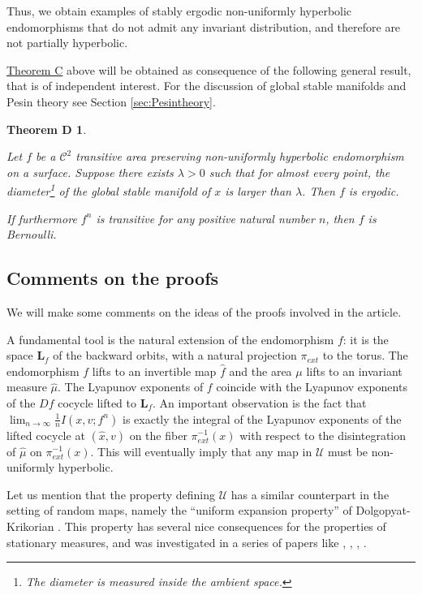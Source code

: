 \documentclass[11pt,letterpaper,reqno]{article}
\newtheorem*{theoremD}{Theorem D}
\newcommand{\hTTf}[1][f]{\mathbf{L}_{#1}}
\begin{document}
Thus, we obtain examples of stably ergodic non-uniformly hyperbolic endomorphisms that do not admit any invariant distribution, and therefore are not partially hyperbolic. 

\smallskip 

\hyperlink{theoremC}{Theorem C} above will be obtained as consequence of the following general result, that is of independent interest. For the discussion of global stable manifolds and Pesin theory see Section \ref{sec:Pesintheory}.

\begin{theoremD}\hypertarget{theoremD}{}
Let $f$ be a $\mathcal C^2$ transitive area preserving non-uniformly hyperbolic endomorphism on a surface. Suppose there exists $\lambda>0$ such that  for almost every point,  the diameter\footnote{The diameter is measured inside the ambient space.} of the global stable manifold of $x$ is larger than $\lambda$. Then $f$ is ergodic.

If furthermore $f^n$ is transitive for any positive natural number $n$, then $f$ is Bernoulli.
\end{theoremD}



\subsection{Comments on the proofs}

We will make some comments on the ideas of the proofs involved in the article.

A fundamental tool is the natural extension of the endomorphism $f$: it is the space $\hTTf$ of the backward orbits, with a natural projection $\pi_{ext}$ to the torus. The endomorphism $f$ lifts to an invertible map $\hat f$ and the area $\mu$ lifts to an invariant measure $\hat\mu$. The Lyapunov exponents of $f$ coincide with the Lyapunov exponents of the $Df$ cocycle lifted to $\hTTf$. An important observation is the fact that $\lim_{n\rightarrow\infty}\frac{1}{n}I(x,v;f^n)$ is exactly the integral of the Lyapunov exponents of the lifted cocycle at $(\hat x,v)$ on the fiber $\pi_{ext}^{-1}(x)$ with respect to the disintegration of $\hat\mu$ on $\pi_{ext}^{-1}(x)$. This will eventually imply that any map in $\mathcal U$ must be non-uniformly hyperbolic. 

Let us mention that the property defining $\mathcal U$ has a similar counterpart in the setting of random maps, namely the ``uniform expansion property'' of Dolgopyat-Krikorian \cite{DK07}. This property has several nice consequences for the properties of stationary measures, and was investigated in a series of papers like \cite{DK07}, \cite{Brown2017}, \cite{Ch20}, \cite{Liu16}.
\end{document}
